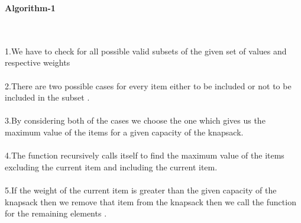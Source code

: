 \documentclass[twocolumn]{article}
\begin{document}
\centerline{\textbf{Algorithm-1}}\\
\noindent\\
1.We have to check for all possible valid subsets of the given set of values and respective weights 
\\
\noindent\\
2.There are two possible cases for every item either to be included or not to be included in the subset .\\
\noindent\\
3.By considering both of the cases we choose the one which gives us the maximum value of the items  for a given capacity of the knapsack.\\
\noindent\\
4.The function recursively calls itself to find the maximum value of the items excluding the current item and including the current item.\\
\noindent\\
5.If the weight of the current item is greater than the given capacity of the knapsack then we remove that item from the knapsack then we call the function for the remaining elements . \\
\end{document}
